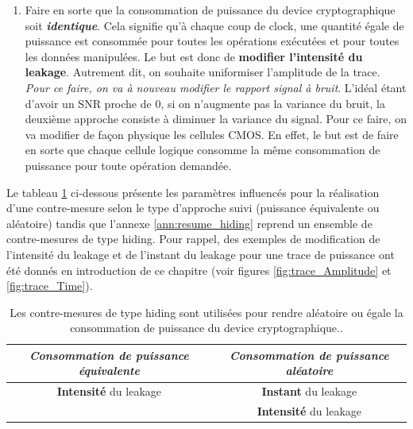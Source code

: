\documentclass[oneside]{book}
\begin{document}
\begin{enumerate}
\begin{itemize}
\end{itemize}
\item Faire en sorte que la consommation de puissance du device cryptographique soit \textbf{\textit{identique}}. Cela signifie qu'à chaque coup de clock, une quantité égale de puissance est consommée pour toutes les opérations exécutées et pour toutes les données manipulées. Le but est donc de \textbf{modifier l'intensité du leakage}. Autrement dit, on souhaite uniformiser l'amplitude de la trace. 
\textit{Pour ce faire, on va à nouveau modifier le rapport signal à bruit}. L'idéal étant d'avoir un SNR proche de 0, si on n'augmente pas la variance du bruit, la deuxième approche consiste à diminuer la variance du signal. Pour ce faire, on va modifier de façon physique les cellules CMOS. En effet, le but est de faire en sorte que chaque cellule logique consomme la même consommation de puissance pour toute opération demandée. \\
\end{enumerate}

\hspace{-0.5cm}Le tableau \ref{tab:hiding} ci-dessous présente les paramètres influencés pour la réalisation d'une contre-mesure selon le type d'approche suivi (puissance équivalente ou aléatoire) tandis que l'annexe \ref{ann:resume_hiding} reprend un ensemble de contre-mesures de type hiding. Pour rappel, des exemples de modification de l'intensité du leakage et de l'instant du leakage pour une trace de puissance ont été donnés en introduction de ce chapitre (voir figures \ref{fig:trace_Amplitude} et \ref{fig:trace_Time}).

\begin{table}[htbp]
	\centering
	\begin{tabular}{|c|c|}
    		\hline
   		  \textit{Consommation de puissance \textbf{équivalente}} & \textit{Consommation de puissance \textbf{aléatoire}} \\ \hline 
   		  \textbf{Intensité} du leakage &  \textbf{Instant} du leakage \\ 
   		   &  \textbf{Intensité} du leakage \\ \hline
	\end{tabular}
    	\caption{Les contre-mesures de type hiding sont utilisées pour rendre aléatoire ou égale la consommation de puissance du device cryptographique..}
    	\label{tab:hiding} 
\end{table}
\end{document}
